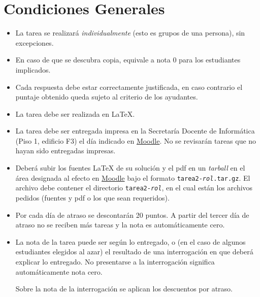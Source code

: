 \section*{Condiciones Generales}

  \begin{itemize}
  \item
    La tarea se realizará \emph{individualmente}
    (esto es grupos de una persona),
    sin excepciones.
    \item En caso de que se descubra copia, equivale a nota 0 para los estudiantes implicados.

  \item
	Cada respuesta debe estar correctamente justificada, 
	en caso contrario el puntaje obtenido queda 
	sujeto al criterio de los ayudantes.
  \item
    La tarea debe ser realizada en \LaTeX{}.
  \item
    La tarea debe ser entregada impresa en
    la Secretaría Docente de Informática
    (Piso 1, edificio F3)
    el día indicado en \href{http://moodle.inf.utfsm.cl}{Moodle}. No se revisarán tareas que no hayan sido entregadas impresas.
  \item Deberá subir los fuentes \LaTeX{} de su solución y el pdf en un \emph{tarball}
    en el área designada al efecto
    en \href{http://moodle.inf.utfsm.cl}{Moodle}
    bajo el formato
    \texttt{tarea2-\emph{rol}.tar.gz}.
    El archivo debe contener el directorio \texttt{tarea2-\emph{rol}},
    en el cual están los archivos pedidos (fuentes y pdf o los que sean requeridos).


  \item
    Por cada día de atraso se descontarán 20 puntos.
    A partir del tercer día de atraso
    no se reciben más tareas y la nota es automáticamente cero.
  \item
    La nota de la tarea puede ser según lo entregado,
    o (en el caso de algunos estudiantes elegidos al azar)
    el resultado de una interrogación en que deberá explicar lo entregado.
    No presentarse a la interrogación significa automáticamente
    nota cero.

    Sobre la nota de la interrogación se aplican los descuentos por atraso.

  \end{itemize}
